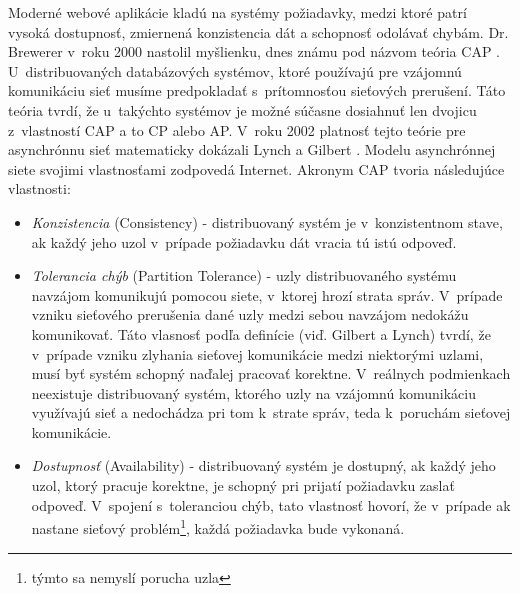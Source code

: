 \documentclass[11pt,twoside,a4paper]{book}
\begin{document}
Moderné webové aplikácie kladú na systémy požiadavky, medzi ktoré patrí vysoká dostupnosť, zmiernená konzistencia dát a schopnosť odolávať chybám. Dr. Brewerer v~roku 2000 nastolil myšlienku, dnes známu pod názvom teória CAP \cite{brewer2000towards}. U~distribuovaných databázových systémov, ktoré používajú pre vzájomnú komunikáciu sieť musíme predpokladať s~prítomnosťou sieťových prerušení. Táto teória tvrdí, že u~takýchto systémov je možné súčasne dosiahnuť len dvojicu z~vlastností CAP a to CP alebo AP. V~roku 2002 platnosť tejto teórie pre asynchrónnu sieť matematicky dokázali Lynch a Gilbert \cite{Gilbert:2002:BCF:564585.564601}. Modelu asynchrónnej siete svojimi vlastnosťami zodpovedá Internet. Akronym CAP tvoria následujúce vlastnosti:
\begin{itemize}
 \item 
  \emph{Konzistencia} (Consistency) - distribuovaný systém je v~konzistentnom stave, ak každý jeho uzol v~prípade požiadavku dát vracia tú istú odpoveď.

\item
  \emph{Tolerancia chýb} (Partition Tolerance) - uzly distribuovaného systému navzájom komunikujú pomocou siete, v~ktorej hrozí strata správ. V~prípade vzniku sieťového prerušenia dané uzly medzi sebou navzájom nedokážu komunikovať. Táto vlasnosť podľa definície (viď. Gilbert a Lynch) tvrdí, že v~prípade vzniku zlyhania sieťovej komunikácie medzi niektorými uzlami, musí byť systém schopný naďalej pracovať korektne. V~reálnych podmienkach neexistuje distribuovaný systém, ktorého uzly na vzájomnú komunikáciu využívajú sieť a nedochádza pri tom k~strate správ, teda k~poruchám sieťovej komunikácie.

\item
  \emph{Dostupnosť} (Availability) - distribuovaný systém je dostupný, ak každý jeho uzol, ktorý pracuje korektne, je schopný pri prijatí požiadavku zaslať odpoveď. V~spojení s~toleranciou chýb, tato vlastnosť hovorí, že v~prípade ak nastane sieťový problém\footnote{týmto sa nemyslí porucha uzla}, každá požiadavka bude vykonaná.

\end{itemize}
\end{document}
